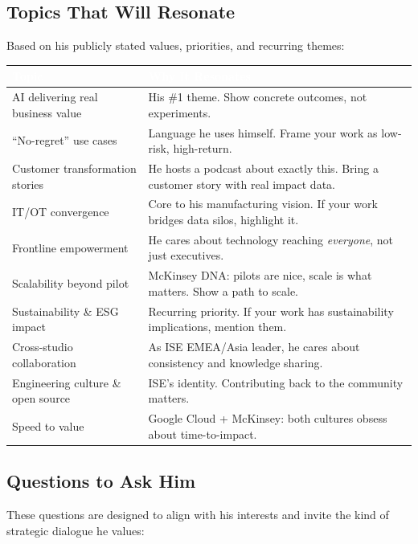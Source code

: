 \documentclass[11pt,a4paper]{article}
\begin{document}
\subsection{Topics That Will Resonate}

Based on his publicly stated values, priorities, and recurring themes:

\begin{center}
\begin{longtable}{L{4cm}L{9.5cm}}
\toprule
{}
\textcolor{white}{\textbf{Topic}} & \textcolor{white}{\textbf{Why It Resonates}} \\
\midrule
AI delivering real business value & His \#1 theme. Show concrete outcomes, not experiments. \\
``No-regret'' use cases & Language he uses himself. Frame your work as low-risk, high-return. \\
Customer transformation stories & He hosts a podcast about exactly this. Bring a customer story with real impact data. \\
IT/OT convergence & Core to his manufacturing vision. If your work bridges data silos, highlight it. \\
Frontline empowerment & He cares about technology reaching \textit{everyone}, not just executives. \\
Scalability beyond pilot & McKinsey DNA: pilots are nice, scale is what matters. Show a path to scale. \\
Sustainability \& ESG impact & Recurring priority. If your work has sustainability implications, mention them. \\
Cross-studio collaboration & As ISE EMEA/Asia leader, he cares about consistency and knowledge sharing. \\
Engineering culture \& open source & ISE's identity. Contributing back to the community matters. \\
Speed to value & Google Cloud + McKinsey: both cultures obsess about time-to-impact. \\
\bottomrule
\end{longtable}
\end{center}

\subsection{Questions to Ask Him}

These questions are designed to align with his interests and invite the kind of strategic dialogue he values:
\end{document}
